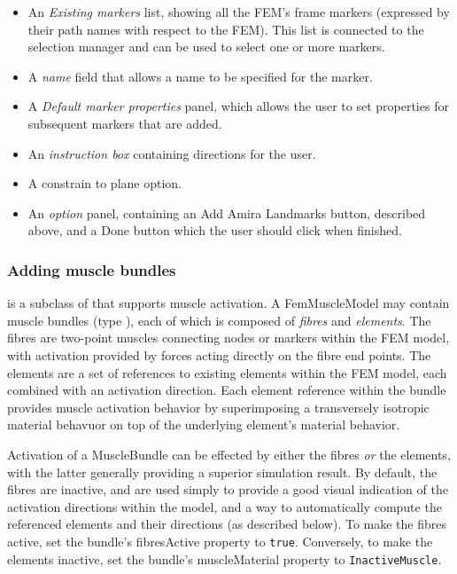 \documentclass{article}
\begin{document}
\begin{itemize}

\item An {\it Existing markers} list, showing all the FEM's frame
markers (expressed by their path names with respect to the
FEM). This list is connected to the selection manager and can be
used to select one or more markers.

\item A {\it name} field that allows a name to be specified for the marker.

\item A {\it Default marker properties} panel, which
allows the user to set properties for subsequent markers that are added.

\item An {\it instruction box} containing directions for the user.

\item A {\sf constrain to plane} option.

\item An {\it option} panel, containing an {\sf Add Amira Landmarks} button,
described above, and a {\sf Done} button which
the user should click when finished.

\end{itemize}

\subsubsection{Adding muscle bundles}

 is a subclass of
 that supports muscle
activation. A FemMuscleModel may contain muscle bundles (type
), each of which is
composed of {\it fibres} and {\it elements}.  The fibres are two-point muscles
connecting nodes or markers within the FEM model, with activation
provided by forces acting directly on the fibre end points.  The
elements are a set of references to existing elements within the FEM
model, each combined with an activation direction. Each element
reference within the bundle provides muscle activation behavior by
superimposing a transversely isotropic material behavuor on top of the
underlying element's material behavior.

Activation of a MuscleBundle can be effected by either the fibres {\it or}
the elements, with the latter generally providing a superior
simulation result. By default, the fibres are inactive, and are used
simply to provide a good visual indication of the activation
directions within the model, and a way to automatically compute the
referenced elements and their directions (as described below).  To
make the fibres active, set the bundle's {\sf fibresActive} property to
{\tt true}. Conversely, to make the elements inactive, set the bundle's
{\sf muscleMaterial} property to {\tt InactiveMuscle}.
\end{document}
